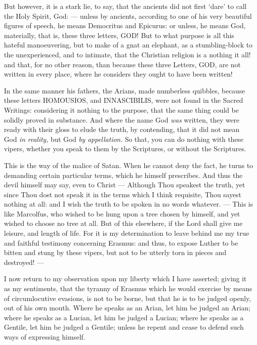 But however, it is a stark lie, to say, that the ancients did not first ‘dare’ to call the Holy Spirit, God: — unless by ancients, according to one of his very beautiful figures of speech, he means Democritus and Epicurus: or unless, he means God, materially, that is, these three letters, \textsc{GOD}! But to what purpose is all this hateful manoeuvering, but to make of a gnat an elephant, as a stumbling-block to the unexperienced, and to intimate, that the Christian religion is a nothing it all! and that, for no other reason, than because these three Letters, GOD, are not written in every place, where he considers they ought to have been written!

In the same manner his fathers, the Arians, made numberless quibbles, because these letters \textsc{HOMOUSIOS}, and \textsc{INNASCIBILIS}, were not found in the Sacred Writings: considering it nothing to the purpose, that the same thing could be solidly proved in substance. And where the name God \emph{was }written, they were ready with their gloss to elude the truth, by contending, that it did not mean God \emph{in reality, }but God \emph{by appellation. }So that, you can do nothing with these vipers, whether you speak to them by the Scriptures, or without the Scriptures.

This is the way of the malice of Satan. When he cannot deny the fact, he turns to demanding certain particular terms, which he himself prescribes. And thus the devil himself may say, even to Christ — Although Thou speakest the truth, yet since Thou dost not speak it in the terms which I think requisite, Thou sayest nothing at all: and I wish the truth to be spoken in no words whatever. — This is like Marcolfus, who wished to be hung upon a tree chosen by himself, and yet wished to choose no tree at all. But of this elsewhere, if the Lord shall give me leisure, and length of life. For it is my determination to leave behind me my true and faithful testimony concerning Erasmus: and thus, to expose Luther to be bitten and stung by these vipers, but not to be utterly torn in pieces and destroyed! —

I now return to my observation upon my liberty which I have asserted; giving it as my sentiments, that the tyranny of Erasmus which he would exercise by means of circumlocutive evasions, is not to be borne, but that he is to be judged openly, out of his own mouth. Where he speaks as an Arian, let him be judged an Arian; where he speaks as a Lucian, let him be judged a Lucian; where he speaks as a Gentile, let him be judged a Gentile; unless he repent and cease to defend such ways of expressing himself.

